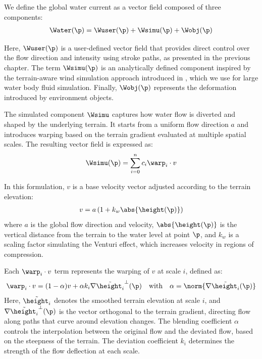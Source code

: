 We define the global water current as a vector field composed of three components:
\begin{align}
    \Water(\p) = \Wuser(\p) + \Wsimu(\p) + \Wobj(\p)
\end{align}

Here, $\Wuser(\p)$ is a user-defined vector field that provides direct control over the flow direction and intensity using stroke paths, as presented in the previous chapter. The term $\Wsimu(\p)$ is an analytically defined component inspired by the terrain-aware wind simulation approach introduced in \cite{Paris2019b}, which we use for large water body fluid simulation. Finally, $\Wobj(\p)$ represents the deformation introduced by environment objects.

The simulated component $\Wsimu$ captures how water flow is diverted and shaped by the underlying terrain. It starts from a uniform flow direction $a$ and introduces warping based on the terrain gradient evaluated at multiple spatial scales. The resulting vector field is expressed as:
\begin{align}
    \Wsimu(\p) = \sum_{i=0}^{n}{c_i \warp_i \cdot v}
\end{align}

In this formulation, $v$ is a base velocity vector adjusted according to the terrain elevation:
\begin{align}
    v = a \left(1 + k_w \abs{\height(\p)} \right)
\end{align}
where $a$ is the global flow direction and velocity, $\abs{\height(\p)}$ is the vertical distance from the terrain to the water level at point $\p$, and $k_w$ is a scaling factor simulating the Venturi effect, which increases velocity in regions of compression.

Each $\warp_i \cdot v$ term represents the warping of $v$ at scale $i$, defined as:
\begin{align}
    \warp_i \cdot v = (1 - \alpha) v + \alpha k_i \nabla \Tilde{\height_i}^{\perp}(\p) \quad \text{with} \quad \alpha = \norm{ \nabla \Tilde{\height_i}(\p) }
\end{align}
Here, $\Tilde{\height_i}$ denotes the smoothed terrain elevation at scale $i$, and $\nabla \Tilde{\height_i}^{\perp}(\p)$ is the vector orthogonal to the terrain gradient, directing flow along paths that curve around elevation changes. The blending coefficient $\alpha$ controls the interpolation between the original flow and the deviated flow, based on the steepness of the terrain. The deviation coefficient $k_i$ determines the strength of the flow deflection at each scale.

